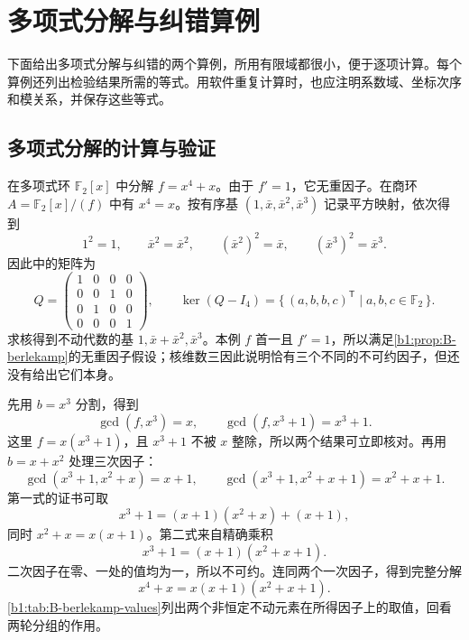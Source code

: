 
\section{多项式分解与纠错算例}
\label{b1:sec:B04}

下面给出多项式分解与纠错的两个算例，所用有限域都很小，便于逐项计算。每个算例还列出检验结果所需的等式。用软件重复计算时，也应注明系数域、坐标次序和模关系，并保存这些等式。

\subsection{多项式分解的计算与验证}
\label{b1:subsec:B04:01}

在多项式环 \(\mathbb F_2[x]\) 中分解 \(f=x^4+x\)。由于 \(f'=1\)，它无重因子。在商环 \(A=\mathbb F_2[x]/(f)\) 中有 \(x^4=x\)。按有序基 \((1,\bar x,\bar x^2,\bar x^3)\) 记录平方映射，依次得到
\[
	1^2=1,\qquad \bar x^2=\bar x^2,\qquad (\bar x^2)^2=\bar x,\qquad (\bar x^3)^2=\bar x^3.
\]
因此中的矩阵为
\[
	Q=\begin{pmatrix}
		1&0&0&0\\0&0&1&0\\0&1&0&0\\0&0&0&1
	\end{pmatrix},\qquad
	\ker(Q-I_4)=\{\,(a,b,b,c)^{\mathsf T}\mid a,b,c\in\mathbb F_2\,\}.
\]
求核得到不动代数的基 \(1,\bar x+\bar x^2,\bar x^3\)。本例 \(f\) 首一且 \(f'=1\)，所以满足\cref{b1:prop:B-berlekamp}的无重因子假设；核维数三因此说明恰有三个不同的不可约因子，但还没有给出它们本身。

\ProseParagraphBreak
先用 \(b=x^3\) 分割，得到
\[
	\gcd(f,x^3)=x,\qquad \gcd(f,x^3+1)=x^3+1.
\]
这里 \(f=x(x^3+1)\)，且 \(x^3+1\) 不被 \(x\) 整除，所以两个结果可立即核对。再用 \(b=x+x^2\) 处理三次因子：
\[
	\gcd(x^3+1,x^2+x)=x+1,\qquad \gcd(x^3+1,x^2+x+1)=x^2+x+1.
\]
第一式的证书可取
\[
	x^3+1=(x+1)(x^2+x)+(x+1),
\]
同时 \(x^2+x=x(x+1)\)。第二式来自精确乘积
\begin{equation}\label{b1:eq:B-factorization-certificate}
	x^3+1=(x+1)(x^2+x+1).
\end{equation}
二次因子在零、一处的值均为一，所以不可约。连同两个一次因子，得到完整分解
\[
	x^4+x=x(x+1)(x^2+x+1).
\]
\cref{b1:tab:B-berlekamp-values}列出两个非恒定不动元素在所得因子上的取值，回看两轮分组的作用。

